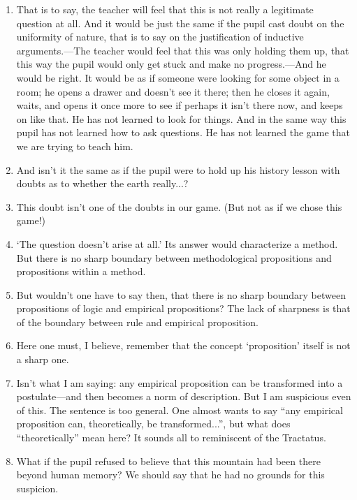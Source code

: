\documentclass{book}
\begin{document}
\begin{enumerate}
\item
That is to say, the teacher will feel that this is not really a legitimate
question at all.  And it would be just the same if the pupil cast doubt on the
uniformity of nature, that is to say on the justification of inductive
arguments.---The teacher would feel that this was only holding them up, that
this way the pupil would only get stuck and make no progress.---And he would be
right. It would be as if someone were looking for some object in a room; he
opens a drawer and doesn't see it there; then he closes it again, waits, and
opens it once more to see if perhaps it isn't there now, and keeps on like
that. He has not learned to look for things. And in the same way this pupil has
not learned how to ask questions. He has not learned the game that we are
trying to teach him.

\item
And isn't it the same as if the pupil were to hold up his history lesson with
doubts as to whether the earth really...?

\item
This doubt isn't one of the doubts in our game. (But not as if we chose this
game!)

\item
`The question doesn't arise at all.' Its answer would characterize a method.
But there is no sharp boundary between methodological propositions and
propositions within a method.

\item
But wouldn't one have to say then, that there is no sharp boundary between
propositions of logic and empirical propositions? The lack of sharpness is that
of the boundary between rule and empirical proposition.

\item
Here one must, I believe, remember that the concept `proposition' itself is not
a sharp one.

\item
Isn't what I am saying: any empirical proposition can be transformed into a
postulate---and then becomes a norm of description. But I am suspicious even of
this. The sentence is too general. One almost wants to say ``any empirical
proposition can, theoretically, be transformed...'', but what does
``theoretically'' mean here? It sounds all to reminiscent of the Tractatus.

\item
What if the pupil refused to believe that this mountain had been there beyond
human memory?  We should say that he had no grounds for this suspicion.


\end{enumerate}
\end{document}
